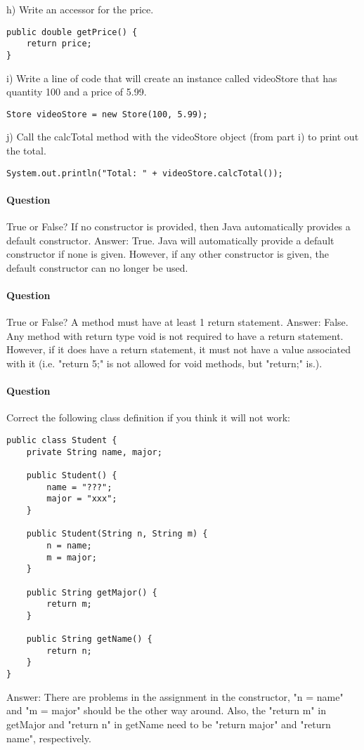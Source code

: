 \documentclass{article}
\begin{document}
h) Write an accessor for the price.
\begin{lstlisting}
public double getPrice() {
	return price;
}
\end{lstlisting}

i) Write a line of code that will create an instance called videoStore that has quantity 100 and a price of 5.99.
\begin{lstlisting}
Store videoStore = new Store(100, 5.99);
\end{lstlisting}

j) Call the calcTotal method with the videoStore object (from part i) to print out the total.
\begin{lstlisting}
System.out.println("Total: " + videoStore.calcTotal());
\end{lstlisting}

\addtocounter{question_num}{1}
\paragraph{Question }
True or False? If no constructor is provided, then Java automatically provides a default constructor. {\color{red} Answer: True. Java will automatically provide a default constructor if none is given. However, if any other constructor is given, the default constructor can no longer be used.}

\addtocounter{question_num}{1}
\paragraph{Question }
True or False? A method must have at least 1 return statement. {\color{red} Answer: False. Any method with return type void is not required to have a return statement. However, if it does have a return statement, it must not have a value associated with it (i.e. "return 5;" is not allowed for void methods, but "return;" is.).}

\addtocounter{question_num}{1}
\paragraph{Question }
Correct the following class definition if you think it will not work:
\begin{lstlisting}
public class Student {
	private String name, major;

	public Student() {
		name = "???";
		major = "xxx";
	}

	public Student(String n, String m) {
		n = name;
		m = major;
	}

	public String getMajor() {
		return m;
	}

	public String getName() {
		return n;
	}
}
\end{lstlisting}
{\color{red}Answer: There are problems in the assignment in the constructor, "n = name" and "m = major" should be the other way around. Also, the "return m" in getMajor and "return n" in getName need to be "return major" and "return name", respectively.}
\end{document}
